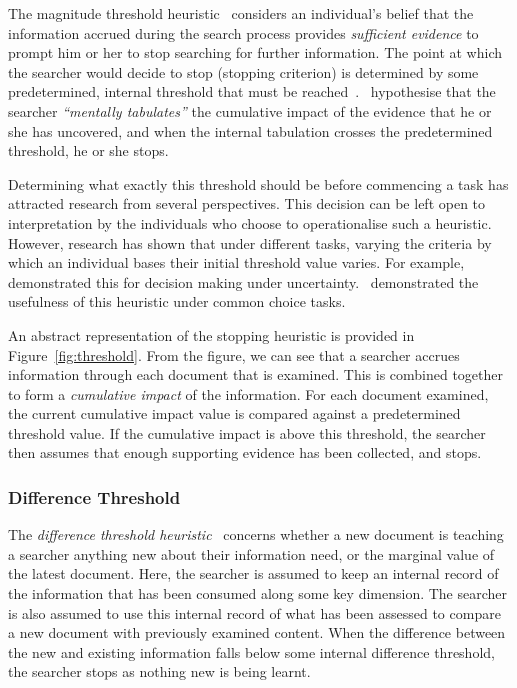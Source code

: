 The magnitude threshold heuristic~\citep{nickles1995judgment} considers an individual's belief that the information accrued during the search process provides \emph{sufficient evidence} to prompt him or her to stop searching for further information. The point at which the searcher would decide to stop (stopping criterion) is determined by some predetermined, internal threshold that must be reached~\citep{wald1948sequential_analysis, nickles1995judgment}.~\cite{gettys1979hypothesis} hypothesise that the searcher \emph{``mentally tabulates''} the cumulative impact of the evidence that he or she has uncovered, and when the internal tabulation crosses the predetermined threshold, he or she stops.

Determining what exactly this threshold should be before commencing a task has attracted research from several perspectives. This decision can be left open to interpretation by the individuals who choose to operationalise such a heuristic. However, research has shown that under different tasks, varying the criteria by which an individual bases their initial threshold value varies. For example,~\cite{busemeyer1982choice_behaviour} demonstrated this for decision making under uncertainty.~\cite{saad1996stopping} demonstrated the usefulness of this heuristic under common choice tasks.

An abstract representation of the stopping heuristic is provided in Figure~\ref{fig:threshold}. From the figure, we can see that a searcher accrues information through each document that is examined. This is combined together to form a \emph{cumulative impact} of the information. For each document examined, the current cumulative impact value is compared against a predetermined threshold value. If the cumulative impact is above this threshold, the searcher then assumes that enough supporting evidence has been collected, and stops.

\subsubsection{Difference Threshold}\label{sec:stopping_background:heuristics:difference}
The \emph{difference threshold heuristic}~\citep{nickles1995judgment} concerns whether a new document is teaching a searcher anything new about their information need, or the marginal value of the latest document. Here, the searcher is assumed to keep an internal record of the information that has been consumed along some key dimension. The searcher is also assumed to use this internal record of what has been assessed to compare a new document with previously examined content. When the difference between the new and existing information falls below some internal difference threshold, the searcher stops as nothing new is being learnt.

